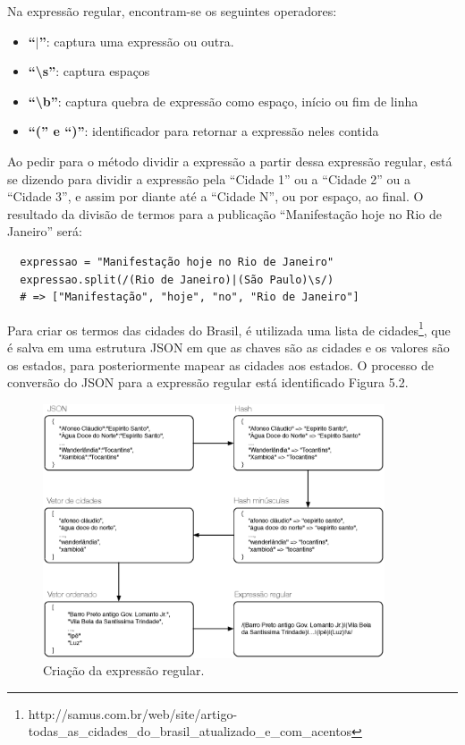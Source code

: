 Na expressão regular, encontram-se os seguintes operadores:

\begin{itemize}
  \item \textbf{``$\mid$''}: captura uma expressão ou outra.
  \item \textbf{``\textbackslash s''}: captura espaços
  \item \textbf{``\textbackslash b''}: captura quebra de expressão como espaço, início ou fim de linha
  \item \textbf{``('' e ``)''}: identificador para retornar a expressão neles contida
\end{itemize}

Ao pedir para o método dividir a expressão a partir dessa expressão regular, está se dizendo para dividir a expressão pela ``Cidade 1'' ou a ``Cidade 2'' ou a ``Cidade 3'', e assim por diante até a ``Cidade N'', ou por espaço, ao final. O resultado da divisão de termos para a publicação ``Manifestação hoje no Rio de Janeiro'' será:

\begin{lstlisting}
  expressao = "Manifestação hoje no Rio de Janeiro"
  expressao.split(/(Rio de Janeiro)|(São Paulo)\s/)
  # => ["Manifestação", "hoje", "no", "Rio de Janeiro"]
\end{lstlisting}

Para criar os termos das cidades do Brasil, é utilizada uma lista de cidades\footnote{http://samus.com.br/web/site/artigo-todas\_as\_cidades\_do\_brasil\_atualizado\_e\_com\_acentos}, que é salva em uma estrutura JSON em que as chaves são as cidades e os valores são os estados, para posteriormente mapear as cidades aos estados. O processo de conversão do JSON para a expressão regular está identificado Figura 5.2.

\begin{figure}[htpb]
  \begin{center}
    \includegraphics[width=0.9\textwidth]{figuras/criacao-regexp.eps}
    \caption{Criação da expressão regular.}
  \end{center}
\end{figure}

